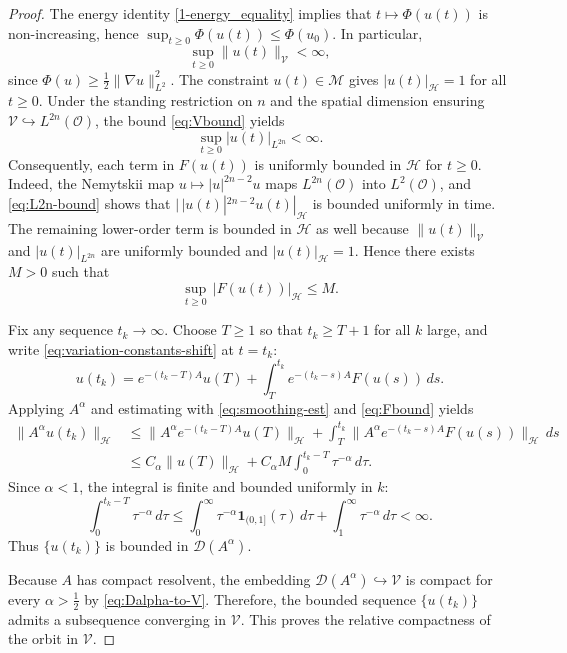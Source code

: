 \documentclass[10pt,a4paper]{amsart}
\numberwithin{equation}{section}
\begin{document}
\begin{proof}
The energy identity \eqref{1-energy_equality} implies that $t\mapsto \Phi(u(t))$ is
non-increasing,
hence $\sup_{t\ge 0}\Phi(u(t))\le \Phi(u_0)$. In particular,
\begin{equation}\label{eq:Vbound}
\sup_{t\ge 0}\|u(t)\|_{\mathcal V}<\infty,
\end{equation}
since $\Phi(u)\ge \frac12\|\nabla u\|_{L^2}^2$. The constraint $u(t)\in\mathcal M$ gives
$|u(t)|_{\mathcal H}=1$ for all $t\ge 0$. Under the standing restriction on $n$ and the
spatial dimension ensuring $\mathcal V\hookrightarrow L^{2n}(\mathcal O)$,
the bound \eqref{eq:Vbound} yields
\begin{equation}\label{eq:L2n-bound}
\sup_{t\ge 0} |u(t)|_{L^{2n}}<\infty.
\end{equation}
Consequently, each term in $F(u(t))$ is uniformly bounded in $\mathcal H$ for $t\ge 0$.
Indeed, the Nemytskii map $u\mapsto |u|^{2n-2}u$ maps $L^{2n}(\mathcal O)$ into
$L^2(\mathcal O)$, and \eqref{eq:L2n-bound} shows that
$|\,|u(t)|^{2n-2}u(t)|_{\mathcal H}$ is bounded uniformly in
time. The remaining lower-order term is bounded in $\mathcal H$ as well because
$\|u(t)\|_{\mathcal V}$ and $|u(t)|_{L^{2n}}$ are uniformly bounded and
$|u(t)|_{\mathcal H}=1$.
Hence there exists $M>0$ such that
\begin{equation}\label{eq:Fbound}
\sup_{t\ge 0}\,|F(u(t))|_{\mathcal H}\le M.
\end{equation}

Fix any sequence $t_k\to\infty$. Choose $T\ge 1$ so that $t_k\ge T+1$ for all $k$ large,
and write
\eqref{eq:variation-constants-shift} at $t=t_k$:
\begin{equation}\label{eq:decomp-tk}
u(t_k)=e^{-(t_k-T)A}u(T)+\int_T^{t_k} e^{-(t_k-s)A}F(u(s))\,ds.
\end{equation}
Applying $A^\alpha$ and estimating with \eqref{eq:smoothing-est} and
\eqref{eq:Fbound} yields
\begin{align*}
\|A^\alpha u(t_k)\|_{\mathcal H}
&\le \|A^\alpha e^{-(t_k-T)A}u(T)\|_{\mathcal H}
     +\int_T^{t_k}\|A^\alpha e^{-(t_k-s)A}F(u(s))\|_{\mathcal H}\,ds\\
&\le C_\alpha\|u(T)\|_{\mathcal H}+ C_\alpha M\int_0^{t_k-T} \tau^{-\alpha}\,d\tau.
\end{align*}
Since $\alpha<1$, the integral is finite and bounded uniformly in $k$:
\[
\int_0^{t_k-T}\tau^{-\alpha}\,d\tau
\le \int_0^{\infty}\tau^{-\alpha}\mathbf 1_{(0,1]}(\tau)\,d\tau
+\int_1^\infty \tau^{-\alpha}\,d\tau <\infty.
\]
Thus $\{u(t_k)\}$ is bounded in $\mathcal D(A^\alpha)$.

Because $A$ has compact resolvent, the embedding
$\mathcal D(A^\alpha)\hookrightarrow \mathcal V$
is compact for every $\alpha>\frac12$ by \eqref{eq:Dalpha-to-V}.
Therefore, the bounded sequence
$\{u(t_k)\}$ admits a subsequence converging in $\mathcal V$.
This proves the relative compactness
of the orbit in $\mathcal V$.
\end{proof}
\end{document}
